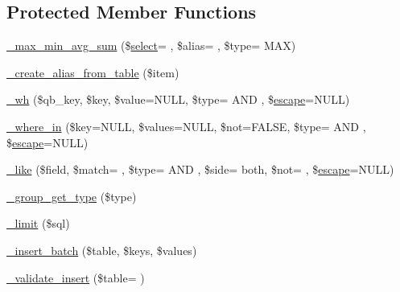 \subsection*{Protected Member Functions}
\begin{DoxyCompactItemize}
\item 
\hyperlink{class_c_i___d_b__query__builder_ab51e293829027327d05172aaf0720f70}{\+\_\+max\+\_\+min\+\_\+avg\+\_\+sum} (\$\hyperlink{class_c_i___d_b__query__builder_ac6194faecb10a2731d6e6016f1714531}{select}= \textquotesingle{}\textquotesingle{}, \$alias= \textquotesingle{}\textquotesingle{}, \$type= \textquotesingle{}M\+A\+X\textquotesingle{})
\item 
\hyperlink{class_c_i___d_b__query__builder_a194edea7be9a8636b67b7d2c8a3de04e}{\+\_\+create\+\_\+alias\+\_\+from\+\_\+table} (\$item)
\item 
\hyperlink{class_c_i___d_b__query__builder_ada64568400d6e49136417e699ec2479d}{\+\_\+wh} (\$qb\+\_\+key, \$key, \$value=N\+U\+L\+L, \$type= \textquotesingle{}A\+N\+D \textquotesingle{}, \$\hyperlink{class_c_i___d_b__driver_ac8f37ca5703d4558c732e692194f8cd6}{escape}=N\+U\+L\+L)
\item 
\hyperlink{class_c_i___d_b__query__builder_a457cb8b8aebdaa5f98489fd31de8e19e}{\+\_\+where\+\_\+in} (\$key=N\+U\+L\+L, \$values=N\+U\+L\+L, \$not=F\+A\+L\+S\+E, \$type= \textquotesingle{}A\+N\+D \textquotesingle{}, \$\hyperlink{class_c_i___d_b__driver_ac8f37ca5703d4558c732e692194f8cd6}{escape}=N\+U\+L\+L)
\item 
\hyperlink{class_c_i___d_b__query__builder_a72f687f2df9c46553fe2c6f58f7c3f1d}{\+\_\+like} (\$field, \$match= \textquotesingle{}\textquotesingle{}, \$type= \textquotesingle{}A\+N\+D \textquotesingle{}, \$side= \textquotesingle{}both\textquotesingle{}, \$not= \textquotesingle{}\textquotesingle{}, \$\hyperlink{class_c_i___d_b__driver_ac8f37ca5703d4558c732e692194f8cd6}{escape}=N\+U\+L\+L)
\item 
\hyperlink{class_c_i___d_b__query__builder_a0101619da9c48cfa269730ace38a774a}{\+\_\+group\+\_\+get\+\_\+type} (\$type)
\item 
\hyperlink{class_c_i___d_b__query__builder_a3a02ea06541b8ecc25a33a61651562c8}{\+\_\+limit} (\$sql)
\item 
\hyperlink{class_c_i___d_b__query__builder_a1978e1358c812587a46e242630365099}{\+\_\+insert\+\_\+batch} (\$table, \$keys, \$values)
\item 
\hyperlink{class_c_i___d_b__query__builder_a48d1269c7c90fd697ed3212ddf3d4647}{\+\_\+validate\+\_\+insert} (\$table= \textquotesingle{}\textquotesingle{})

\end{DoxyCompactItemize}
